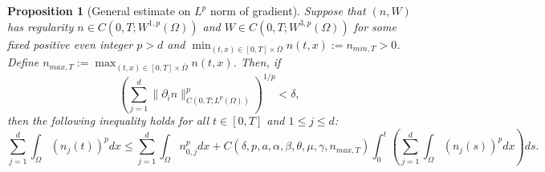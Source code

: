 \documentclass[12pt]{article}
\theoremstyle{plain}
\newtheorem{proposition}{Proposition}[section]
\begin{document}
\begin{proposition}[General estimate on $L^{p}$ norm of gradient]\label{W1pgeneral}
Suppose that $(n, W)$ has regularity $n \in C(0, T; W^{1, p}(\Omega))$ and $W \in C(0, T; W^{3, p}(\Omega))$ for some fixed positive even integer $p > d$ and $\min_{(t, x) \in [0, T] \times \overline{\Omega}} n(t, x) := n_{min, T} > 0$. Define $n_{max, T} := \max_{(t, x) \in [0, T] \times \overline{\Omega}} n(t, x)$. Then, if $$\left(\sum_{j = 1}^{d} \|\partial_{i}n\|^{p}_{C(0, T; L^{p}(\Omega))}\right)^{1/p} < \delta,$$ then the following inequality holds for all $t \in [0, T]$ and $1 \le j \le d$:
\begin{equation*}
\sum_{j = 1}^{d} \int_{\Omega} (n_{j}(t))^{p} dx \le \sum_{j = 1}^{d} \int_{\Omega} n_{0, j}^{p} dx + C(\delta, p, a, \alpha, \beta, \theta, \mu, \gamma, n_{max, T}) \int_{0}^{t} \left(\sum_{j = 1}^{d} \int_{\Omega} (n_{j}(s))^{p} dx\right) ds.
\end{equation*}
\end{proposition}
\end{document}
